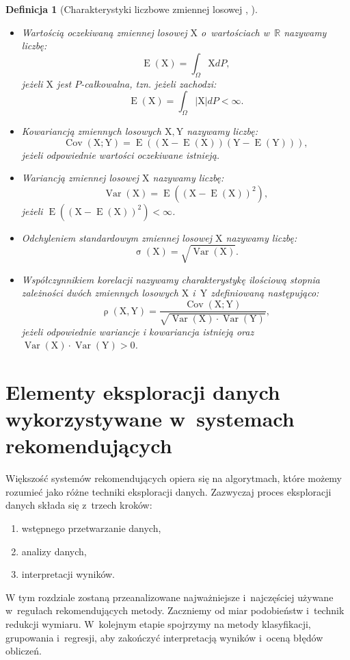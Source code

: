 \documentclass[12pt,a4paper]{report}
\newtheorem{df}{Definicja}[chapter]
\newcommand{\setR}{\mathbb{R}}
\newcommand{\ro}[2]{\operatorname{\rho}\left( {#1},{#2} \right)}
\newcommand{\Covariance}[2]{\operatorname{Cov}\left({#1}; {#2} \right)}
\newcommand{\variance}[1]{\operatorname{Var}\left({#1} \right)}
\newcommand{\e}[1]{\operatorname{E}\left({#1} \right)}
\newcommand{\standard}[1]{\operatorname{\sigma}\left({#1} \right)}
\begin{document}
\begin{df}[Charakterystyki liczbowe zmiennej losowej {\citep{jakubowski}}, {\citep{wztp}}]
${}$
\begin{itemize}
\item Wartością oczekiwaną zmiennej losowej $\mathrm{X}$ o~wartościach w~$\setR$ nazywamy liczbę:
$$
\e{\mathrm{X}} = \int_{\Omega} \mathrm{X} dP,
$$
jeżeli $\mathrm{X}$ jest $P$-całkowalna, tzn. jeżeli zachodzi:
$$
\e{\mathrm{X}} = \int_{\Omega} |\mathrm{X}| dP < \infty.
$$

\item Kowariancją zmiennych losowych $\mathrm{X},\mathrm{Y}$ nazywamy liczbę:
$$
\Covariance{\mathrm{X}}{\mathrm{Y}} = \e{(\mathrm{X}-\e{\mathrm{X}})(\mathrm{Y}-\e{\mathrm{Y}})},
$$
jeżeli odpowiednie wartości oczekiwane istnieją.

\item Wariancją zmiennej losowej $\mathrm{X}$ nazywamy liczbę:
$$
\variance{\mathrm{X}}=\e{(\mathrm{X}-\e{\mathrm{X}})^2},
$$
jeżeli $\e{(\mathrm{X}-\e{\mathrm{X}})^2} < \infty$.

\item Odchyleniem standardowym zmiennej losowej $\mathrm{X}$ nazywamy liczbę:
$$
\standard{\mathrm{X}}=\sqrt{\variance{\mathrm{X}}}.
$$

\item Współczynnikiem korelacji nazywamy charakterystykę ilościową stopnia zależności dwóch zmiennych losowych $\mathrm{X}$ i~$\mathrm{Y}$ zdefiniowaną następująco:
$$
\ro{\mathrm{X}}{\mathrm{Y}} = \frac{\Covariance{\mathrm{X}}{\mathrm{Y}}}{\sqrt{\variance{\mathrm{X}}\cdot \variance{\mathrm{Y}}}},
$$
jeżeli odpowiednie wariancje i kowariancja istnieją oraz $\variance{\mathrm{X}} \cdot \variance{\mathrm{Y}}>0$.
\end{itemize}
\end{df}



\chapter{Elementy eksploracji danych wykorzystywane w~systemach rekomendujących}
Większość systemów rekomendujących opiera się na algorytmach, które możemy rozumieć jako różne techniki eksploracji danych. 
Zazwyczaj proces eksploracji danych składa się z~trzech kroków:
\begin{enumerate}
\item wstępnego przetwarzanie danych,
\item analizy danych,
\item interpretacji wyników.
\end{enumerate}
W tym rozdziale zostaną przeanalizowane najważniejsze i~najczęściej używane w~regułach rekomendujących metody. Zaczniemy od miar podobieństw i~technik redukcji wymiaru. W~kolejnym etapie spojrzymy na metody klasyfikacji, grupowania i~regresji, aby zakończyć interpretacją wyników i~oceną błędów obliczeń.
\end{document}
